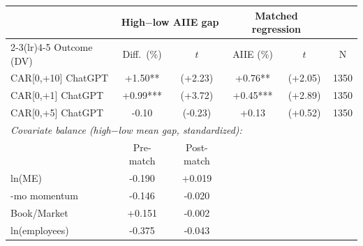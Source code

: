 \begin{tabular}{lccccc}
\toprule
& \multicolumn{2}{c}{High$-$low AIIE gap} & \multicolumn{2}{c}{Matched regression} & \\
\cmidrule(lr){2-3}\cmidrule(lr){4-5}
Outcome (DV) & Diff.\ (\%) & $t$ & AIIE (\%) & $t$ & N \\
\midrule
CAR[0,+10] ChatGPT & +1.50** & (+2.23) & +0.76** & (+2.05) & 1350 \\
CAR[0,+1] ChatGPT & +0.99*** & (+3.72) & +0.45*** & (+2.89) & 1350 \\
CAR[0,+5] ChatGPT & -0.10 & (-0.23) & +0.13 & (+0.52) & 1350 \\
\midrule
\multicolumn{6}{l}{\emph{Covariate balance (high$-$low mean gap, standardized):}} \\
 & Pre-match & Post-match & & & \\
\quad ln(ME) & -0.190 & +0.019 \\
\quad 6-mo momentum & -0.146 & -0.020 \\
\quad Book/Market & +0.151 & -0.002 \\
\quad ln(employees) & -0.375 & -0.043 \\
\bottomrule
\end{tabular}